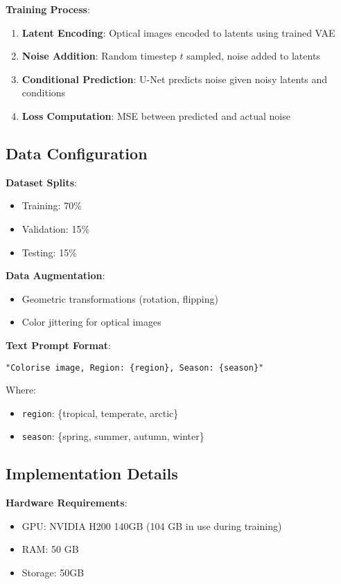\textbf{Training Process}:
\begin{enumerate}
    \item \textbf{Latent Encoding}: Optical images encoded to latents using trained VAE
    \item \textbf{Noise Addition}: Random timestep $t$ sampled, noise added to latents
    \item \textbf{Conditional Prediction}: U-Net predicts noise given noisy latents and conditions
    \item \textbf{Loss Computation}: MSE between predicted and actual noise
\end{enumerate}

\subsection{Data Configuration}

\textbf{Dataset Splits}:
\begin{itemize}
    \item Training: 70\%
    \item Validation: 15\%
    \item Testing: 15\%
\end{itemize}

\textbf{Data Augmentation}:
\begin{itemize}
    \item Geometric transformations (rotation, flipping)
    \item Color jittering for optical images
\end{itemize}

\textbf{Text Prompt Format}:
\begin{center}
\texttt{"Colorise image, Region: \{region\}, Season: \{season\}"}
\end{center}

Where:
\begin{itemize}
    \item \texttt{region}: \{tropical, temperate, arctic\}
    \item \texttt{season}: \{spring, summer, autumn, winter\}
\end{itemize}

\subsection{Implementation Details}

\textbf{Hardware Requirements}:
\begin{itemize}
    \item GPU: NVIDIA H200 140GB (104 GB in use during training)
    \item RAM: 50 GB
    \item Storage: 50GB
\end{itemize}

